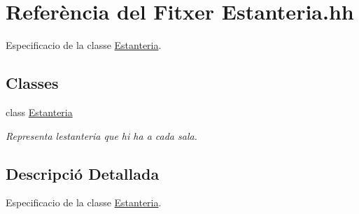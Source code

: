 \hypertarget{_estanteria_8hh}{}\section{Referència del Fitxer Estanteria.\+hh}
\label{_estanteria_8hh}


Especificacio de la classe \hyperlink{class_estanteria}{Estanteria}.  


\subsection*{Classes}
\begin{DoxyCompactItemize}
\item 
class \hyperlink{class_estanteria}{Estanteria}
\begin{DoxyCompactList}\small\item\em Representa l\textquotesingle{}estanteria que hi ha a cada sala. \end{DoxyCompactList}\end{DoxyCompactItemize}


\subsection{Descripció Detallada}
Especificacio de la classe \hyperlink{class_estanteria}{Estanteria}. 

